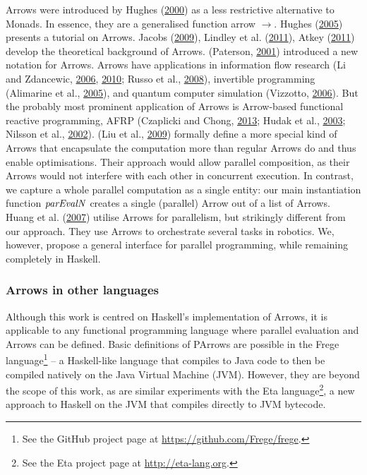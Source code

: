 \documentclass[paper=A4,twoside=true,openright,parskip=full,chapterprefix=true,headings=normal,bibliography=totoc,listof=totoc,titlepage=on,captions=tableabove,draft=false,british]{scrreprt}%
\begin{document}
Arrows were introduced by Hughes
(\protect\hyperlink{ref-HughesArrows}{2000}) as a less restrictive
alternative to Monads. In essence, they are a generalised function arrow
\ensuremath{\to }. Hughes (\protect\hyperlink{ref-Hughes2005}{2005}) presents a
tutorial on Arrows. Jacobs
(\protect\hyperlink{ref-jacobs_heunen_hasuo_2009}{2009}), Lindley et al.
(\protect\hyperlink{ref-LINDLEY201197}{2011}), Atkey
(\protect\hyperlink{ref-ATKEY201119}{2011}) develop the theoretical
background of Arrows. (Paterson,
\protect\hyperlink{ref-Paterson:2001:NNA:507669.507664}{2001})
introduced a new notation for Arrows. Arrows have applications in
information flow research (Li and Zdancewic,
\protect\hyperlink{ref-1648705}{2006},
\protect\hyperlink{ref-LI20101974}{2010}; Russo et al.,
\protect\hyperlink{ref-Russo:2008:LLI:1411286.1411289}{2008}),
invertible programming (Alimarine et al.,
\protect\hyperlink{ref-Alimarine:2005:BAA:1088348.1088357}{2005}), and
quantum computer simulation (Vizzotto,
\protect\hyperlink{ref-vizzotto_altenkirch_sabry_2006}{2006}). But the
probably most prominent application of Arrows is Arrow-based functional
reactive programming, AFRP (Czaplicki and Chong,
\protect\hyperlink{ref-Czaplicki:2013:AFR:2499370.2462161}{2013}; Hudak
et al., \protect\hyperlink{ref-Hudak2003}{2003}; Nilsson et al.,
\protect\hyperlink{ref-Nilsson:2002:FRP:581690.581695}{2002}). (Liu et
al., \protect\hyperlink{ref-Liu:2009:CCA:1631687.1596559}{2009})
formally define a more special kind of Arrows that encapsulate the
computation more than regular Arrows do and thus enable optimisations.
Their approach would allow parallel composition, as their Arrows would
not interfere with each other in concurrent execution. In contrast, we
capture a whole parallel computation as a single entity: our main
instantiation function \ensuremath{\Varid{parEvalN}} creates a single (parallel) Arrow out
of a list of Arrows. Huang et al.
(\protect\hyperlink{ref-Huang2007}{2007}) utilise Arrows for
parallelism, but strikingly different from our approach. They use Arrows
to orchestrate several tasks in robotics. We, however, propose a general
interface for parallel programming, while remaining completely in
Haskell.

\hypertarget{arrows-in-other-languages}{%
\subsubsection{Arrows in other
languages}\label{arrows-in-other-languages}}

Although this work is centred on Haskell's implementation of Arrows, it
is applicable to any functional programming language where parallel
evaluation and Arrows can be defined. Basic definitions of PArrows are
possible in the Frege language\footnote{See the GitHub project page at
  \url{https://github.com/Frege/frege}.} -- a Haskell-like language that
compiles to Java code to then be compiled natively on the Java Virtual
Machine (JVM). However, they are beyond the scope of this work, as are
similar experiments with the Eta language\footnote{See the Eta project page at
  \url{http://eta-lang.org}.}, a new approach to Haskell on the JVM that
compiles directly to JVM bytecode.
\end{document}
